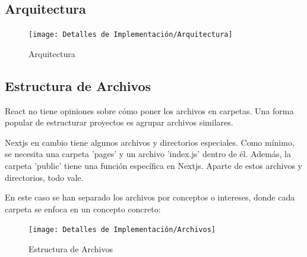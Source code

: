 \documentclass[12pt,twoside,titlepage]{report}
\begin{document}
\subsection{Arquitectura}
\begin{figure}[H]
    \centering
    \texttt{[image: Detalles de Implementación/Arquitectura]}
    \label{fig:Arquitectura}
    \caption{Arquitectura}
\end{figure}

\subsection{Estructura de Archivos}

React no tiene opiniones sobre cómo poner los archivos en carpetas. Una forma popular de estructurar proyectos es agrupar archivos similares.

Nextjs en cambio tiene algunos archivos y directorios especiales. Como mínimo, se necesita una carpeta 'pages' y un archivo 'index.js' dentro de él. Además, la carpeta 'public' tiene una función específica en Nextjs. Aparte de estos archivos y directorios, todo vale.

En este caso se han separado los archivos por conceptos o intereses, donde cada carpeta se enfoca en un concepto concreto:

\begin{figure}[H]
    \centering
    \texttt{[image: Detalles de Implementación/Archivos]}
    \label{fig:Archivos}
    \caption{Estructura de Archivos}
\end{figure}
\end{document}

